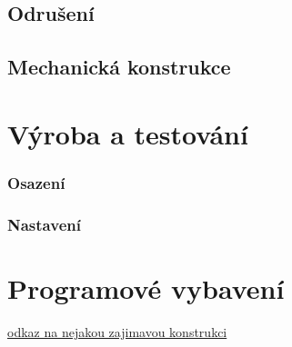 \documentclass[12pt,a4paper,oneside]{article}
\begin{document}
\subsection{Odrušení}

\subsection{Mechanická konstrukce}

\section{Výroba a testování}

\subsubsection{Osazení}

\subsubsection{Nastavení}

\section{Programové vybavení}


\begin{thebibliography}{99}
\href{http:// odkaz na nejakou zajimavou konstrukci}{odkaz na nejakou zajimavou konstrukci}

\end{thebibliography}
\end{document}
